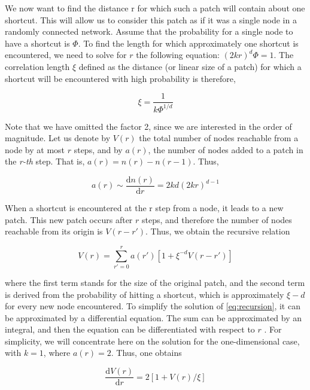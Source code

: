 \documentclass[12pt]{article}
\newcommand{\nd}{\noindent}
\begin{document}
We now want to find the distance r for which such a patch will contain about one shortcut. This will allow us to consider this patch as if it was a single node in a randomly connected network. Assume that the probability for a single node to have a shortcut is $\Phi$. To find the length for which approximately one shortcut is encountered, we need to solve for $r$ the following equation: $(2kr)^d \Phi = 1$. The correlation length $\xi$ defined as the distance (or linear size of a patch) for which a shortcut will be encountered with high probability is therefore,

\begin{equation}
    \xi = \frac{1}{k \Phi^{1/d}}
\end{equation}

\nd Note that we have omitted the factor 2, since we are interested in the order of magnitude. Let us denote by $V(r)$ the total number of nodes reachable from a node by at most $r$ steps, and by $a(r)$, the number of nodes added to a patch in the \emph{r-th} step. That is, $a(r) = n(r) - n(r-1)$. Thus,

\begin{equation}
    a(r) \sim \frac{\text{d} n(r)}{\text{d} r} = 2kd(2kr)^{d-1}
\end{equation}

\nd When a shortcut is encountered at the r step from a node, it leads to a new patch. This new patch occurs after $r$ steps, and therefore the number of nodes reachable from its origin is $V (r - r')$. Thus, we obtain the recursive  relation

\begin{equation} \label{eq:recursion}
    V(r) = \sum_{r'=0}^r a(r') [1 + \xi^{-d}V(r-r')]
\end{equation}

\nd where the first term stands for the size of the original patch, and the second term is derived from the probability of hitting a shortcut, which is approximately $\xi -d $ for every new node encountered. To simplify the solution of \ref{eq:recursion}, it can be approximated by a differential equation. The sum can be approximated by an integral, and then the equation can be differentiated with respect to $r$ . For simplicity, we will concentrate here on the solution for the one-dimensional case, with $k = 1$, where $a(r) = 2$. Thus, one obtains

\begin{equation}
    \frac{\text{d} V(r)}{\text{d} r} = 2 [1 + V(r)/\xi]
\end{equation}
\end{document}
